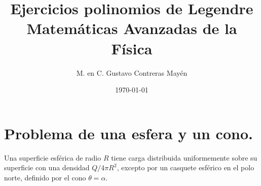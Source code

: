 
\title{Ejercicios polinomios de Legendre \\[0.3em]  \large{Matemáticas Avanzadas de la Física}\vspace{-3ex}}
\author{M. en C. Gustavo Contreras Mayén}
\date{\today}

\vspace{-4cm}
\maketitle
\fontsize{14}{14}\selectfont

\section{Problema de una esfera y un cono.}

Una superficie esférica de radio $R$ tiene carga distribuida uniformemente sobre su superficie con una densidad $Q / 4 \pi R^{2}$, excepto por un casquete esférico en el polo norte, definido por el cono $\theta = \alpha$.

